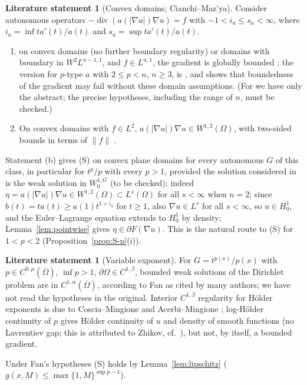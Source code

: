 \documentclass[11pt]{amsart}
\theoremstyle{definition}
\newtheorem{fact}[theorem]{Literature statement}
\theoremstyle{remark}
\numberwithin{equation}{section}
\newcommand{\abs}[1]{\lvert #1\rvert}
\newcommand{\norm}[1]{\lVert #1\rVert}
\DeclareMathOperator{\divg}{div}
\begin{document}
\begin{fact}[Convex domains; Cianchi--Maz'ya]\label{fact:CM}
Consider autonomous operators $-\divg(a(\abs{\nabla u})\nabla u)=f$ with $-1<i_a\le s_a<\infty$, where $i_a=\inf ta'(t)/a(t)$ and $s_a=\sup ta'(t)/a(t)$.
\begin{enumerate}[label=(\alph*)]
\item on convex domains (no further boundary regularity) or domains with boundary in $W^2L^{n-1,1}$, and $f\in L^{n,1}$, the gradient is globally bounded \cite{CianchiMazya2011}; the version for $p$-type $a$ with $2\le p<n$, $n\ge3$, is \cite[Thm.~3.5]{CianchiMazya2014JEMS}, and \cite{CianchiMazya2014JEMS} shows that boundedness of the gradient may fail without these domain assumptions. (For \cite{CianchiMazya2011} we have only the abstract; the precise hypotheses, including the range of $n$, must be checked.)
\item On convex domains with $f\in L^2$, $a(\abs{\nabla u})\nabla u\in W^{1,2}(\Omega)$, with two-sided bounds in terms of $\norm f$ \cite[Thm.~2.3]{CianchiMazya2018}.
\end{enumerate}
\end{fact}
Statement (b) gives (S) on convex plane domains for every autonomous $G$ of this class, in particular for $t^p/p$ with every $p>1$, provided the solution considered in \cite{CianchiMazya2018} is the weak solution in $W^{1,G}_0$ (to be checked): indeed $\eta=a(\abs{\nabla u})\nabla u\in W^{1,2}(\Omega)\subset L^s(\Omega)$ for all $s<\infty$ when $n=2$; since $b(t)=ta(t)\ge a(1)t^{1+i_a}$ for $t\ge1$, also $\nabla u\in L^s$ for all $s<\infty$, so $u\in H^1_0$, and the Euler--Lagrange equation extends to $H^1_0$ by density; Lemma~\ref{lem:pointwise} gives $\eta\in\partial F(\nabla u)$. This is the natural route to (S) for $1<p<2$ (Proposition~\ref{prop:S-p}(i)).

\begin{fact}[Variable exponent]\label{fact:px}
For $G=t^{p(x)}/p(x)$ with $p\in C^{0,\mu}(\overline\Omega)$, $\inf p>1$, $\partial\Omega\in C^{1,\beta}$, bounded weak solutions of the Dirichlet problem are in $C^{1,\alpha}(\overline\Omega)$, according to Fan \cite{Fan2007} as cited by many authors; we have not read the hypotheses in the original. Interior $C^{1,\beta}$ regularity for H\"older exponents is due to Coscia--Mingione \cite{CosciaMingione1999} and Acerbi--Mingione \cite{AcerbiMingione2001}; log-H\"older continuity of $p$ gives H\"older continuity of $u$ and density of smooth functions (no Lavrentiev gap; this is attributed to Zhikov, cf.\ \cite{Zhikov1995}), but not, by itself, a bounded gradient.
\end{fact}
Under Fan's hypotheses (S) holds by Lemma~\ref{lem:lipschitz} ($g(x,M)\le\max\{1,M\}^{\sup p-1}$).
\end{document}

